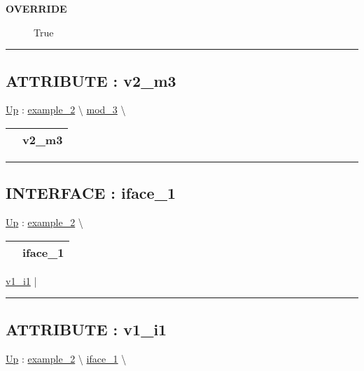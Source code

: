 \par

\par
\begin{description}
\item [\textbf{OVERRIDE}] True
\end{description}

\rule{\linewidth}{0.5pt}
\subsection*{ATTRIBUTE : v2\_m3}
\hypertarget{ecldoc:intest.inintest.example_2.mod_3.v2_m3}{}
\hyperlink{ecldoc:intest.inintest.example_2.mod_3}{Up} :
\hspace{0pt} \hyperlink{ecldoc:intest.inintest.example_2}{example_2} \textbackslash 
\hspace{0pt} \hyperlink{ecldoc:intest.inintest.example_2.mod_3}{mod_3} \textbackslash 

{\renewcommand{\arraystretch}{1.5}
\begin{tabularx}{\textwidth}{|>{\raggedright\arraybackslash}l|X|}
\hline
\hspace{0pt} & v2\_m3 \\
\hline
\end{tabularx}
}

\par


\rule{\linewidth}{0.5pt}


\subsection*{INTERFACE : iface\_1}
\hypertarget{ecldoc:intest.inintest.example_2.iface_1}{}
\hyperlink{ecldoc:intest.inintest.example_2}{Up} :
\hspace{0pt} \hyperlink{ecldoc:intest.inintest.example_2}{example_2} \textbackslash 

{\renewcommand{\arraystretch}{1.5}
\begin{tabularx}{\textwidth}{|>{\raggedright\arraybackslash}l|X|}
\hline
\hspace{0pt} & iface\_1 \\
\hline
\end{tabularx}
}

\par


\hyperlink{ecldoc:intest.inintest.example_2.iface_1.v1_i1}{v1\_i1}  |

\rule{\linewidth}{0.5pt}

\subsection*{ATTRIBUTE : v1\_i1}
\hypertarget{ecldoc:intest.inintest.example_2.iface_1.v1_i1}{}
\hyperlink{ecldoc:intest.inintest.example_2.iface_1}{Up} :
\hspace{0pt} \hyperlink{ecldoc:intest.inintest.example_2}{example_2} \textbackslash 
\hspace{0pt} \hyperlink{ecldoc:intest.inintest.example_2.iface_1}{iface_1} \textbackslash 

